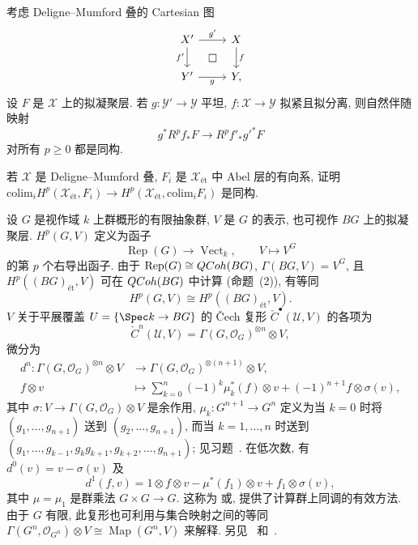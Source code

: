 \begin{exercise}[平坦基变换]\label{src:5.1.43}
考虑 Deligne--Mumford 叠的 Cartesian 图
\[
\begin{tikzcd}
\mathcal X'\arrow[r,"{g'}"]\arrow[d,"{f'}"']&\mathcal X\arrow[d,"f"]\\
\mathcal Y'\arrow[r,"g"']\arrow[ur,phantom,"\square" description]&\mathcal Y,
\end{tikzcd}
\]
设 $F$ 是 $\mathcal X$ 上的拟凝聚层. 若 $g:\mathcal Y'\to\mathcal Y$ 平坦, $f:\mathcal X\to\mathcal Y$ 拟紧且拟分离, 则自然伴随映射
\[
g^*R^pf_*F\longrightarrow R^pf'_*g'^*F
\]
对所有 $p\geq0$ 都是同构.
\end{exercise}
\begin{exercise}\label{src:5.1.44}
若 $\mathcal X$ 是 Deligne--Mumford 叠, $F_i$ 是 $\mathcal X_{\text{ét}}$ 中 Abel 层的有向系, 证明 $\mathrm{colim}_i H^p(\mathcal X_{\text{ét}},F_i)\to H^p(\mathcal X_{\text{ét}},\mathrm{colim}_i F_i)$ 是同构.
\end{exercise}
\begin{example}[群上同调]\label{src:5.1.45}
设 $G$ 是视作域 $k$ 上群概形的有限抽象群, $V$ 是 $G$ 的表示, 也可视作 $BG$ 上的拟凝聚层.  $H^p(G,V)$ 定义为函子
\[
\operatorname{Rep}(G)\longrightarrow\operatorname{Vect}_k,\qquad V\longmapsto V^G
\]
的第 $p$ 个右导出函子. 由于 $\operatorname{Rep}(G)\cong QCoh(BG)$, $\Gamma(BG,V)=V^G$, 且 $H^p((BG)_{\text{ét}},V)$ 可在 $QCoh(BG)$ 中计算 (命题~(2)), 有等同
\[
H^p(G,V)\cong H^p((BG)_{\text{ét}},V).
\]
$V$ 关于平展覆盖 $\mathcal U=\{\Spec k\to BG\}$ 的 Čech 复形 $\check C^\bullet(\mathcal U,V)$ 的各项为
\[
\check C^n(\mathcal U,V)=\Gamma(G,\mathcal O_G)^{\otimes n}\otimes V,
\]
微分为
\begin{equation}\label{src:5.1.46}
\begin{aligned}
d^n:\Gamma(G,\mathcal O_G)^{\otimes n}\otimes V&\longrightarrow\Gamma(G,\mathcal O_G)^{\otimes(n+1)}\otimes V,\\
f\otimes v&\longmapsto\sum_{k=0}^n(-1)^k\mu_k^*(f)\otimes v+(-1)^{n+1}f\otimes\sigma(v),
\end{aligned}
\end{equation}
其中 $\sigma:V\to\Gamma(G,\mathcal O_G)\otimes V$ 是余作用, $\mu_k:G^{n+1}\to G^n$ 定义为当 $k=0$ 时将 $(g_1,\ldots,g_{n+1})$ 送到 $(g_2,\ldots,g_{n+1})$, 而当 $k=1,\ldots,n$ 时送到 $(g_1,\ldots,g_{k-1},g_kg_{k+1},g_{k+2},\ldots,g_{n+1})$; 见习题~. 在低次数, 有 $d^0(v)=v-\sigma(v)$ 及
\[
d^1(f,v)=1\otimes f\otimes v-\mu^*(f_1)\otimes v+f_1\otimes\sigma(v),
\]
其中 $\mu=\mu_1$ 是群乘法 $G\times G\to G$. 这称为 或, 提供了计算群上同调的有效方法. 由于 $G$ 有限, 此复形也可利用与集合映射之间的等同 $\Gamma(G^n,\mathcal O_{G^n})\otimes V\cong\operatorname{Map}(G^n,V)$ 来解释. 另见~\cite[\S6]{Wei94} 和~\cite[\S1]{Bro94}.
\end{example}
